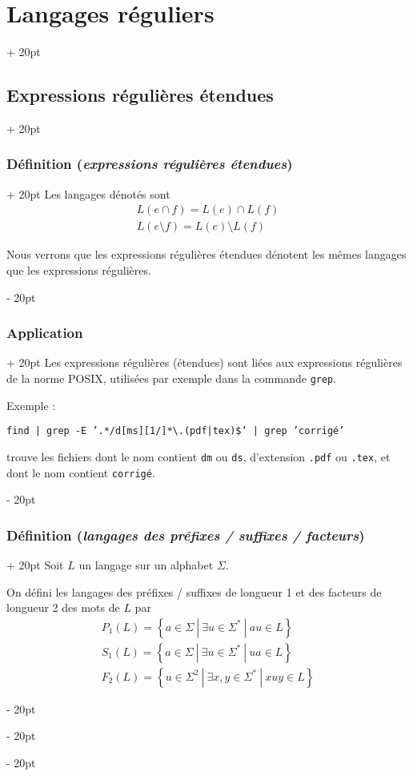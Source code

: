 \documentclass[a4paper, 12pt, twoside]{article}
\newcommand{\set}[1]{\left\{ #1 \right\}}
\newcommand{\ind}[1][20pt]{\advance\leftskip + #1}
\newcommand{\deind}[1][20pt]{\advance\leftskip - #1}
\newenvironment{indt}[2][20pt]{#2 \par \ind[#1]}{\par \deind} %
\begin{document}
\begin{indt}{\section{Langages réguliers}}
\begin{indt}{\subsection{Expressions régulières étendues}}
\begin{indt}{\subsubsection{Définition (\textit{expressions régulières étendues})}}
                Les langages dénotés sont
                \[
                    \begin{array}{l}
                        L(e \cap f) = L(e) \cap L(f)
                        \\
                        L(e\setminus f) = L(e) \setminus L(f)
                    \end{array}
                \]

                Nous verrons que les expressions régulières étendues dénotent les mêmes langages que les expressions régulières.
            \end{indt}

            \vspace{12pt}
            
            \begin{indt}{\subsubsection{Application}}
                Les expressions régulières (étendues) sont liées aux expressions régulières de la norme POSIX, utilisées par exemple dans la commande \texttt{grep}.

                Exemple :
                \begin{center}
                    \texttt{find | grep -E '.*/d[ms][1/]*\textbackslash .(pdf|tex)\$' | grep 'corrigé'}
                \end{center}
                trouve les fichiers dont le nom contient \texttt{dm} ou \texttt{ds}, d'extension \texttt{.pdf} ou \texttt{.tex}, et dont le nom contient \texttt{corrigé}.
            \end{indt}

            \vspace{12pt}
            
            \begin{indt}{\subsubsection{Définition (\textit{langages des préfixes / suffixes / facteurs})}}
                Soit $L$ un langage sur un alphabet $\Sigma$.

                On défini les langages des préfixes / suffixes de longueur 1 et des facteurs de longueur 2 des mots de $L$ par
                \[
                    \begin{array}{l}
                        P_1(L) = \set{a \in \Sigma\ |\ \exists u \in \Sigma^*\ |\ au \in L}
                        \\
                        S_1(L) = \set{a \in \Sigma\ |\ \exists u \in \Sigma^*\ |\ ua \in L}
                        \\
                        F_2(L) = \set{u \in \Sigma^2\ |\ \exists x, y \in \Sigma^*\ |\ xuy \in L}
                    \end{array}
                \]
            \end{indt}


\end{indt}
\end{indt}
\end{document}
